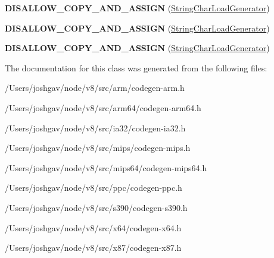 \begin{DoxyCompactItemize}
\item 
{\bfseries D\+I\+S\+A\+L\+L\+O\+W\+\_\+\+C\+O\+P\+Y\+\_\+\+A\+N\+D\+\_\+\+A\+S\+S\+I\+GN} (\hyperlink{classv8_1_1internal_1_1_string_char_load_generator}{String\+Char\+Load\+Generator})\hypertarget{classv8_1_1internal_1_1_string_char_load_generator_a27e623def83ec363c32aac15adcc58d6}{}\label{classv8_1_1internal_1_1_string_char_load_generator_a27e623def83ec363c32aac15adcc58d6}

\item 
{\bfseries D\+I\+S\+A\+L\+L\+O\+W\+\_\+\+C\+O\+P\+Y\+\_\+\+A\+N\+D\+\_\+\+A\+S\+S\+I\+GN} (\hyperlink{classv8_1_1internal_1_1_string_char_load_generator}{String\+Char\+Load\+Generator})\hypertarget{classv8_1_1internal_1_1_string_char_load_generator_a27e623def83ec363c32aac15adcc58d6}{}\label{classv8_1_1internal_1_1_string_char_load_generator_a27e623def83ec363c32aac15adcc58d6}

\item 
{\bfseries D\+I\+S\+A\+L\+L\+O\+W\+\_\+\+C\+O\+P\+Y\+\_\+\+A\+N\+D\+\_\+\+A\+S\+S\+I\+GN} (\hyperlink{classv8_1_1internal_1_1_string_char_load_generator}{String\+Char\+Load\+Generator})\hypertarget{classv8_1_1internal_1_1_string_char_load_generator_a27e623def83ec363c32aac15adcc58d6}{}\label{classv8_1_1internal_1_1_string_char_load_generator_a27e623def83ec363c32aac15adcc58d6}

\end{DoxyCompactItemize}


The documentation for this class was generated from the following files\+:\begin{DoxyCompactItemize}
\item 
/\+Users/joshgav/node/v8/src/arm/codegen-\/arm.\+h\item 
/\+Users/joshgav/node/v8/src/arm64/codegen-\/arm64.\+h\item 
/\+Users/joshgav/node/v8/src/ia32/codegen-\/ia32.\+h\item 
/\+Users/joshgav/node/v8/src/mips/codegen-\/mips.\+h\item 
/\+Users/joshgav/node/v8/src/mips64/codegen-\/mips64.\+h\item 
/\+Users/joshgav/node/v8/src/ppc/codegen-\/ppc.\+h\item 
/\+Users/joshgav/node/v8/src/s390/codegen-\/s390.\+h\item 
/\+Users/joshgav/node/v8/src/x64/codegen-\/x64.\+h\item 
/\+Users/joshgav/node/v8/src/x87/codegen-\/x87.\+h\end{DoxyCompactItemize}
